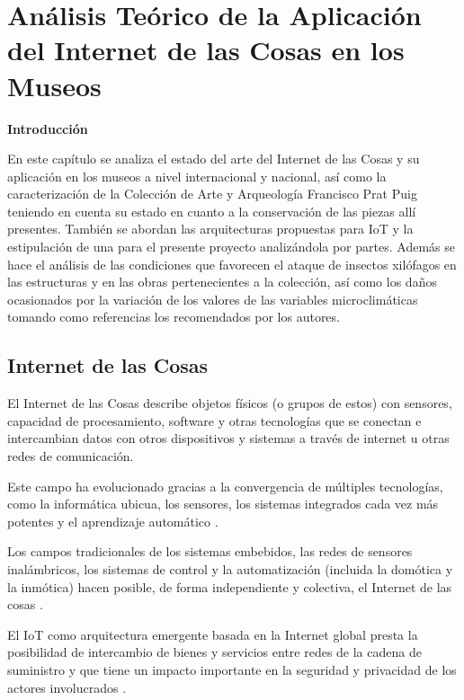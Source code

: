 \chapter{Análisis Teórico de la Aplicación del Internet de las Cosas en los Museos} \label{cap:analisis_teorico}

        \textbf{\Large Introducción}\newline

        En este capítulo se analiza el estado del arte del Internet de las Cosas y su aplicación en los museos a nivel internacional y nacional, así como la caracterización de la
        Colección de Arte y Arqueología Francisco Prat Puig teniendo en cuenta su estado en cuanto a la conservación de las piezas allí presentes. También se abordan las arquitecturas propuestas para IoT y la estipulación de una para el presente proyecto analizándola por partes.
        Además se hace el análisis de las condiciones que favorecen el ataque de insectos xilófagos en las estructuras y en las obras pertenecientes a la colección, así como los daños ocasionados por la variación de los valores de las variables microclimáticas tomando como referencias los recomendados por los autores.

    \section{Internet de las Cosas}

    El Internet de las Cosas describe objetos físicos (o grupos de estos) con sensores, capacidad de procesamiento, software y otras tecnologías que se conectan e intercambian datos con otros dispositivos y sistemas a través de internet u otras redes de comunicación.

    Este campo ha evolucionado gracias a la convergencia de múltiples tecnologías, como la informática ubicua, los sensores, los sistemas integrados cada vez más potentes y el aprendizaje automático \cite{carrasco}. 

    Los campos tradicionales de los sistemas embebidos, las redes de sensores inalámbricos, los sistemas de control y la automatización (incluida la domótica y la inmótica) hacen posible, de forma independiente y colectiva, el Internet de las cosas \cite{lennox}.

    El IoT como arquitectura emergente basada en la Internet global presta la posibilidad de intercambio de bienes y servicios entre redes de la cadena de suministro y que tiene un impacto importante en la seguridad y privacidad de los actores involucrados \cite{weber}. 

